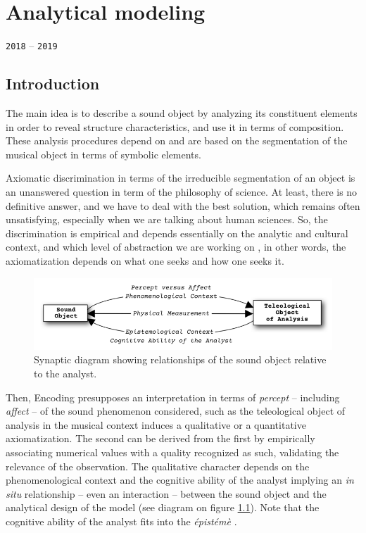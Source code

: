 \chapter{Analytical modeling}
\thispagestyle{empty}

{\texttt{2018} -- \texttt{2019}}
\bigskip
\smallskip
\label{am}

\section{Introduction}

The main idea is to describe a sound object by analyzing its constituent elements in order to reveal structure characteristics, and use it in terms of composition.
These analysis procedures depend on and are based on the segmentation of the musical object in terms of symbolic elements.

\smallskip

Axiomatic discrimination in terms of the irreducible segmentation of an object is an unanswered question in term of the philosophy of science. At least, there is no definitive answer, and we have to deal with the best solution, which remains often unsatisfying, especially when we are talking about human sciences. So, the discrimination is empirical and depends essentially on the analytic and cultural context, and which level of abstraction we are working on \citep{sn}, in other words, the axiomatization depends on what one seeks and how one seeks it.

\begin{figure}[!hbt]
	\begin{center}
		\includegraphics[width=\columnwidth]{img/7583}
		\caption{Synaptic diagram showing relationships of the sound object relative to the analyst.}
		\label{fig:sdqq}
	\end{center}
\end{figure}

Then, Encoding presupposes an interpretation in terms of \textit{percept} -- including \textit{affect} -- of the sound phenomenon considered, such as the teleological object of analysis in the musical context induces a qualitative or a quantitative axiomatization. The second can be derived from the first by empirically associating numerical values with a quality recognized as such, validating the relevance of the observation. The qualitative character depends on the phenomenological context and the cognitive ability of the analyst implying an \textit{in situ} relationship -- even an interaction -- between the sound object and the analytical design of the model (see diagram on figure \ref{fig:sdqq}). Note that the cognitive ability of the analyst fits into the \textit{\'epist\'em\`e} \citep{mflmelc}.
	
